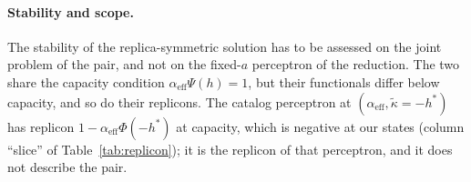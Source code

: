 %

\paragraph{Stability and scope.}
The stability of the replica-symmetric solution has to be assessed on the joint problem of the pair, and not on the fixed-$a$ perceptron of the reduction. The two share the capacity condition $\alpha_{\mathrm{eff}}\Psi(h)=1$, but their functionals differ below capacity, and so do their replicons. The catalog perceptron at $(\alpha_{\mathrm{eff}},\tilde\kappa=-h^*)$ has replicon $1-\alpha_{\mathrm{eff}}\Phi(-h^*)$ at capacity, which is negative at our states (column ``slice'' of Table~\ref{tab:replicon}); it is the replicon of that perceptron, and it does not describe the pair.

